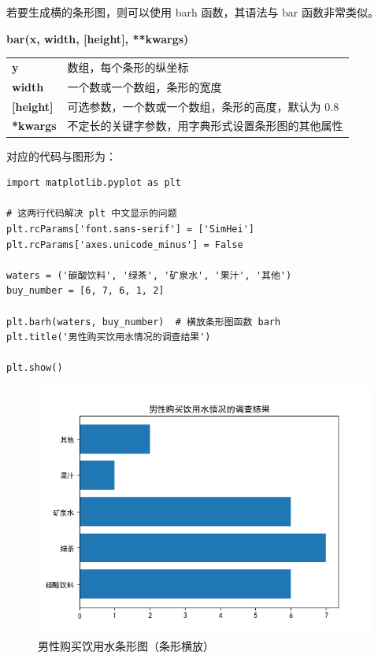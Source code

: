 若要生成横的条形图，则可以使用 barh 函数，其语法与 bar 函数非常类似。

\begin{center}
\begin{tcolorbox}[title = barh 函数的语法]
\textbf{bar(x, width, [height], **kwargs)}
\tcblower
\vspace{10pt}

\begin{tcboutputlisting}
\begin{tabular}{>{\bfseries}ll}
    y &数组，每个条形的纵坐标\\
    width & 一个数或一个数组，条形的宽度\\

  [height] &可选参数，一个数或一个数组，条形的高度，默认为 0.8\\

**kwargs &不定长的关键字参数，用字典形式设置条形图的其他属性
\end{tabular}
\end{tcboutputlisting}
\tcbuselistingtext
\end{tcolorbox}
\end{center}

对应的代码与图形为：

\begin{lstlisting}[Language=Python]
import matplotlib.pyplot as plt

# 这两行代码解决 plt 中文显示的问题
plt.rcParams['font.sans-serif'] = ['SimHei']
plt.rcParams['axes.unicode_minus'] = False

waters = ('碳酸饮料', '绿茶', '矿泉水', '果汁', '其他')
buy_number = [6, 7, 6, 1, 2]

plt.barh(waters, buy_number)  # 横放条形图函数 barh
plt.title('男性购买饮用水情况的调查结果')

plt.show()
\end{lstlisting}

\begin{figure}[!ht]
  \centering
  \includegraphics[scale=0.8]{figure/bar2.png}
  \caption{男性购买饮用水条形图（条形横放）}\label{fig:bar2}
\end{figure}



